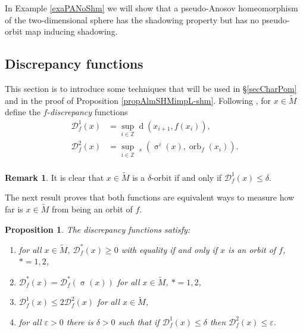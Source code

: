 \documentclass[12pt]{amsart}
\DeclareMathOperator{\shift}{\sigma}
\theoremstyle{plain}
\newtheorem{prop}[thm]{Proposition}
\theoremstyle{definition}
\newtheorem{rmk}[thm]{Remark}
\theoremstyle{remark}
\DeclareMathOperator{\dist}{d}
\DeclareMathOperator{\tdist}{\tilde{d}}
\DeclareMathOperator{\orb}{orb}
\newcommand{\Z}{\mathbb Z}
\renewcommand{\epsilon}{\varepsilon}
\newcommand{\tM}{\tilde{M}}
\begin{document}
In Example \ref{exaPANoShm} we will show that a pseudo-Anosov homeomorphism of the two-dimensional sphere has the shadowing property but has no pseudo-orbit map inducing shadowing.

\subsection{Discrepancy functions}
\label{secDiscrepancy functions}
This section is to introduce some techniques that will be used in
\S\ref{secCharPom} and in the proof of Proposition
\ref{propAlmSHMimpL-shm}.
Following \cite{KOP},
for $x\in \tM$ define the $f$-\textit{discrepancy} functions
\begin{align*}
	\mathcal{D}^1_f(x)  &=\sup_{i\in\Z}\dist(x_{i+1},f(x_i)),\\
	\mathcal{D}^2_f(x) &=\sup_{i\in\Z}\tdist_s(\shift^i(x),\orb_f(x_i)).\\
\end{align*}

\begin{rmk}
	It is clear that $x\in \tM$ is a $\delta$-orbit if and only if
	$\mathcal{D}^1_f(x)\leq \delta$.
\end{rmk}

The next result proves that both functions are equivalent ways to measure how far is $x\in \tM$ from being an orbit of $f$.



\begin{prop}
	\label{propDiscrep}
	The discrepancy functions satisfy:
	\begin{enumerate}
		\item for all $x\in \tM$, $\mathcal{D}^*_f(x)\geq 0$ with equality if and only if $x$ is an orbit of $f$, $*=1,2$,
		\item $\mathcal{D}^*_f(x)=\mathcal{D}^*_f(\shift(x))$ for all $x\in \tM$, $*=1,2$,
		\item $\mathcal{D}^1_f(x)\leq2\mathcal{D}^2_f(x)$ for all $x\in \tM$,
		\item for all $\epsilon>0$ there is $\delta>0$ such that
		if $\mathcal{D}^1_f(x)\leq\delta$ then
		$\mathcal{D}^2_f(x)\leq\epsilon$.
	\end{enumerate}
\end{prop}
\end{document}

